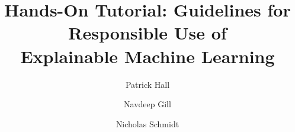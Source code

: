 \documentclass[sigconf]{acmart}
\begin{document}
\title[Responsible XAI]{\huge{Hands-On Tutorial: Guidelines for Responsible Use of\\ Explainable Machine Learning}}


\author{Patrick Hall}

\author{Navdeep Gill}

\author{Nicholas Schmidt }

\renewcommand{\shortauthors}{Hall, Gill, \& Schmidt}

%

%
%



		
		
\end{document}
